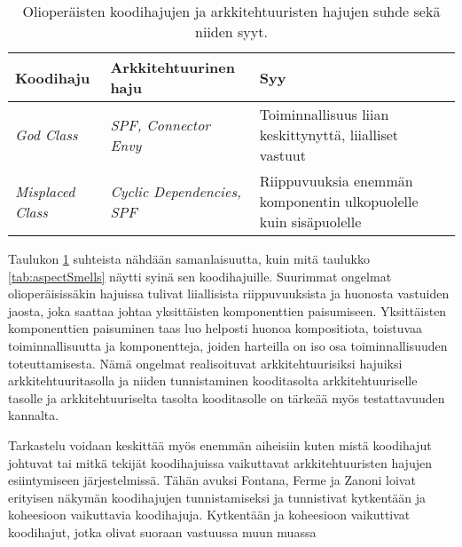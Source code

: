 \documentclass[finnish]{tktltiki2}
\numberwithin{table}{section}
\theoremstyle{definition}
\theoremstyle{remark}
\begin{document}
\begin{table}[h]
	\centering
	\begin{tabular}{| l | l | m{3.5cm} |}
	\hline
	\textbf{Koodihaju} & \textbf{Arkkitehtuurinen haju} & \textbf{Syy}\\ \hline
	\textit{God Class} & \textit{SPF, Connector Envy} &  Toiminnallisuus liian keskittynyttä, liialliset vastuut\\ \hline
	\textit{Misplaced Class} & \textit{Cyclic Dependencies, SPF} & Riippuvuuksia enemmän komponentin ulkopuolelle kuin sisäpuolelle\\ \hline
	\end{tabular}
	\caption{Olioperäisten koodihajujen ja arkkitehtuuristen hajujen suhde sekä niiden syyt.}
	\label{tab:codeSmells}
\end{table}


\noindent
Taulukon \ref{tab:codeSmells} suhteista nähdään samanlaisuutta, kuin mitä taulukko \ref{tab:aspectSmells} näytti syinä sen koodihajuille. Suurimmat ongelmat olioperäisissäkin hajuissa tulivat liiallisista riippuvuuksista ja huonosta vastuiden jaosta, joka saattaa johtaa yksittäisten komponenttien paisumiseen. Yksittäisten komponenttien paisuminen taas luo helposti huonoa kompositiota, toistuvaa toiminnallisuutta ja komponentteja, joiden harteilla on iso osa toiminnallisuuden toteuttamisesta. Nämä ongelmat realisoituvat arkkitehtuurisiksi hajuiksi arkkitehtuuritasolla ja niiden tunnistaminen kooditasolta arkkitehtuuriselle tasolle ja arkkitehtuuriselta tasolta kooditasolle on tärkeää myös testattavuuden kannalta.



Tarkastelu voidaan keskittää myös enemmän aiheisiin kuten mistä koodihajut johtuvat tai mitkä tekijät koodihajuissa vaikuttavat arkkitehtuuristen hajujen esiintymiseen järjestelmissä. Tähän avuksi Fontana, Ferme ja Zanoni loivat erityisen näkymän koodihajujen tunnistamiseksi ja tunnistivat kytkentään ja koheesioon vaikuttavia koodihajuja. Kytkentään ja koheesioon vaikuttivat koodihajut, jotka olivat suoraan vastuussa muun muassa \citep{fontana_towards_2015}

\end{document}
